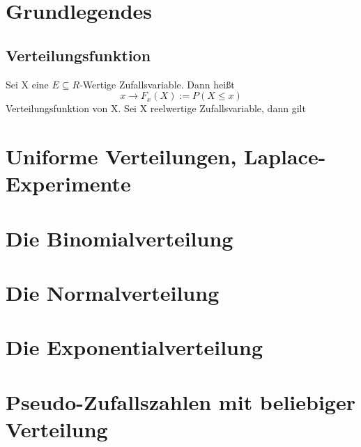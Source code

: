 \documentclass{report}
\begin{document}
\section*{Grundlegendes}
\subsection*{Verteilungsfunktion}
Sei X eine $E \subseteq R$-Wertige Zufallsvariable. Dann heißt \[x \rightarrow F_x(X) := P(X \leq x)\] Verteilungsfunktion von X. Sei X reelwertige Zufallsvariable, dann gilt

\section*{Uniforme Verteilungen, Laplace-Experimente}
\section*{Die Binomialverteilung}
\section*{Die Normalverteilung}
\section*{Die Exponentialverteilung}
\section*{Pseudo-Zufallszahlen mit beliebiger Verteilung}
\end{document}
